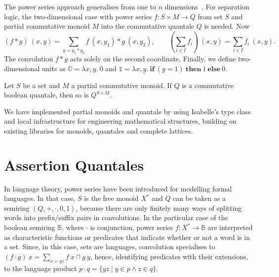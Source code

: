 \documentclass[twoside,runningheads,envcountsame,envcountsect,oribibl,orivec]{llncs}
\def \unit {\mathbb{1}}
\def \zero {\mathbb{O}}
\begin{document}
The power series approach generalises from one to $n$
dimensions~\cite{DHS14}. For separation logic, the
two-dimensional case with power series $f:S \times M\to Q$ from 
set $S$ and partial commutative monoid $M$ into the commutative
quantale $Q$ is needed.  Now
\begin{equation*}
(f \ast g)\ (x,y) = \sum_{y=y_1\ast y_2} f\ (x,y_1)\ast g\ (x,y_2),\qquad
  (\sum_{i\in I} f_i)\ (x,y)  = \sum_{i\in I} f_i\ (x,y).
\end{equation*}
The convolution $f\ast g$ acts solely on the second
coordinate. Finally, we define two-dimensional units as $\zero =
\lambda x,y.\ 0$ and $\unit = \lambda x,y.\ \textbf{if}\ (y = 1)\
\textbf{then}\ 1\ \textbf{else}\ 0$.
\begin{theorem}\label{thm:sh-lifting}
  Let $S$ be a set and $M$ a partial commutative monoid. If $Q$ is a
  commutative boolean quantale, then so is $Q^{S\times M}$.
\end{theorem}
We have implemented partial monoids and quantale by using Isabelle's
type class and local infrastructure for engineering mathematical
structures, building on existing libraries for monoids, quantales and
complete lattices.



\section{Assertion Quantales}\label{S:assertion_quantale}

In language theory, power series have been introduced for modelling
formal languages.  In that case, $S$ is the free monoid $X^\ast$ and
$Q$ can be taken as a semiring $(Q,+,\cdot,0,1)$, because there are
only finitely many ways of splitting words into prefix/suffix pairs in
convolutions.  In the particular case of the boolean semiring
$\mathbb{B}$, where $\cdot$ is conjunction, power series $f:X^\ast\to
\mathbb{B}$ are interpreted as characteristic functions or predicates
that indicate whether or not a word is in a set. Since, in this case,
sets are languages, convolution specialises to $(f\cdot g)\ x =
\sum_{x=yz} f\ x \sqcap g\ y$, hence, identifying predicates with
their extensions, to the language product $p\cdot q=\{yz\mid y\in
p\wedge z\in q\}$.
\end{document}
